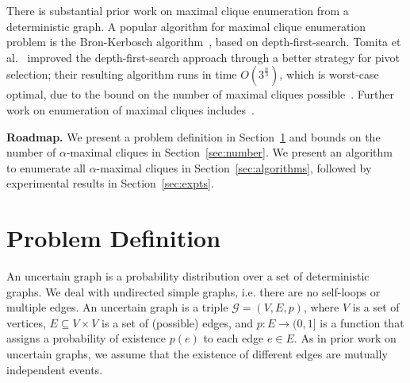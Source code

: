 \documentclass[11pt,letterpaper]{article}
\newcommand{\ugraph}{\mathcal{G}}
\newcommand{\remove}[1]{}
\begin{document}
There is substantial prior work on maximal clique enumeration from a deterministic graph. A popular algorithm for maximal clique enumeration problem is the Bron-Kerbosch algorithm~\cite{BK1973}, based on depth-first-search. Tomita et al.~\cite{TTT06} improved the depth-first-search approach through a better strategy for pivot selection; their resulting algorithm runs in time $O(3^{\frac{n}3})$, which is worst-case optimal, due to the bound on the number of maximal cliques possible~\cite{MM65}. Further work on enumeration of maximal cliques includes~\cite{Cazals08,Eppstein11,Modani08,Tsukiyama77,Chiba85,Johnson88,Makino04}.

{\bf Roadmap.} We present a problem definition in Section~\ref{sec:problem} and bounds on the number of $\alpha$-maximal cliques in Section~\ref{sec:number}. We present an algorithm to enumerate all $\alpha$-maximal cliques in Section~\ref{sec:algorithms}, followed by experimental results in Section~\ref{sec:expts}.


\remove{
{\color{blue}
Hence managing uncertain datasets have been a recent focus of the
Database community~\cite{AJKO2008,DHY2009,FHOR2011}.
For this work we focus on graph datasets. 
Graphs represent relationships which can sometimes only be
quantified probabilistically.
}
}

\remove{
{\color{blue}
Although dense substructures like quasi--clique, k-core etc can be
more practical due to the fact that it doesn't need all the edges 
to be present among the set of participating vertices~\cite{PYB2012}, 
these structures are not as fundamental as a maximal clique. 
Since even this fundamental problem is not solved in the context of 
uncertain graphs, we focus on enumerating maximal cliques in this 
work and leave other dense substructures as important open problems.
}
}

\section{Problem Definition}
\label{sec:problem}

An uncertain graph is a probability distribution over a set of
deterministic graphs. 
We deal with undirected simple graphs, i.e. there are no self-loops or
multiple edges. An uncertain graph is a triple $\ugraph=(V,E,p)$, 
where $V$ is a set of vertices, $E \subseteq V \times V$ is
a set of (possible) edges, and $p:E \rightarrow(0,1]$ is a function
that assigns a probability of existence $p(e)$ to each edge $e \in E$.
As in prior work on uncertain graphs, we assume that the existence of
different edges are mutually independent events.
\end{document}
